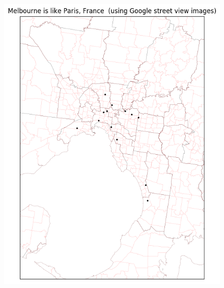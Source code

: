 \documentclass[sageh,times]{sagej}
\begin{document}
\begin{figure}[!htbp]
\centering    
\includegraphics[scale=0.40]{Images/Melbourne_Paris,France-GSV.png} 

\end{figure}
\end{document}
